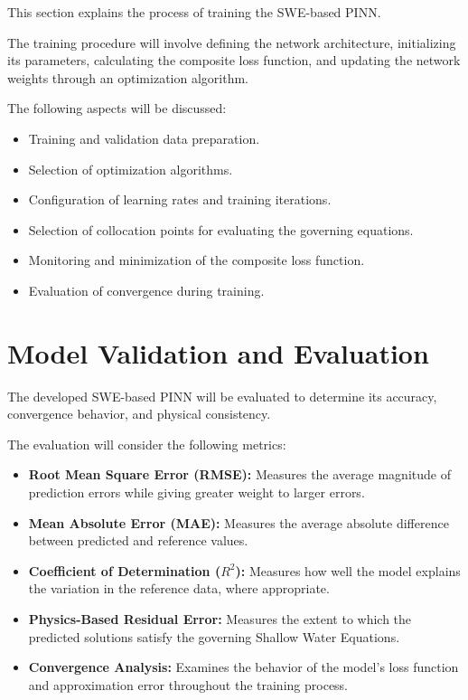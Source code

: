 This section explains the process of training the SWE-based PINN.

The training procedure will involve defining the network architecture, initializing its parameters, calculating the composite loss function, and updating the network weights through an optimization algorithm.

The following aspects will be discussed:

\begin{itemize}
    \item Training and validation data preparation.
    \item Selection of optimization algorithms.
    \item Configuration of learning rates and training iterations.
    \item Selection of collocation points for evaluating the governing equations.
    \item Monitoring and minimization of the composite loss function.
    \item Evaluation of convergence during training.
\end{itemize}

\section{Model Validation and Evaluation}

The developed SWE-based PINN will be evaluated to determine its accuracy, convergence behavior, and physical consistency.

The evaluation will consider the following metrics:

\begin{itemize}
    \item \textbf{Root Mean Square Error (RMSE):} Measures the average magnitude of prediction errors while giving greater weight to larger errors.
    
    \item \textbf{Mean Absolute Error (MAE):} Measures the average absolute difference between predicted and reference values.
    
    \item \textbf{Coefficient of Determination ($R^2$):} Measures how well the model explains the variation in the reference data, where appropriate.
    
    \item \textbf{Physics-Based Residual Error:} Measures the extent to which the predicted solutions satisfy the governing Shallow Water Equations.
    
    \item \textbf{Convergence Analysis:} Examines the behavior of the model's loss function and approximation error throughout the training process.
\end{itemize}

